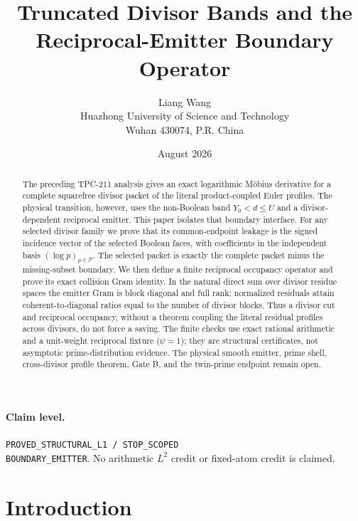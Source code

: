 \documentclass[11pt]{article}
\title{\textbf{Truncated Divisor Bands and the Reciprocal-Emitter Boundary Operator}}
\author{Liang Wang\\
Huazhong University of Science and Technology\\
Wuhan 430074, P.R. China}
\date{August 2026}
\theoremstyle{definition}
\theoremstyle{remark}
\newcommand{\PP}{\mathcal P}
\begin{document}
\maketitle

\begin{abstract}
The preceding TPC-211 analysis gives an exact logarithmic M\"obius derivative for a
complete squarefree divisor packet of the literal product-coupled Euler profiles.
The physical transition, however, uses the non-Boolean band $Y_0<d\leq U$ and a
divisor-dependent reciprocal emitter.  This paper isolates that boundary interface.
For any selected divisor family we prove that its common-endpoint leakage is the
signed incidence vector of the selected Boolean faces, with coefficients in the
independent basis $(\log p)_{p\in\PP}$.  The selected packet is exactly the complete
packet minus the missing-subset boundary.  We then define a finite reciprocal
occupancy operator and prove its exact collision Gram identity.  In the natural
direct sum over divisor residue spaces the emitter Gram is block diagonal and full
rank; normalized residuals attain coherent-to-diagonal ratios equal to the number
of divisor blocks.  Thus a divisor cut and reciprocal occupancy, without a theorem
coupling the literal residual profiles across divisors, do not force a saving.  The
finite checks use exact rational arithmetic and a unit-weight reciprocal fixture
($\psi=1$); they are structural certificates, not asymptotic prime-distribution
evidence.  The physical smooth emitter, prime shell, cross-divisor profile theorem,
Gate B, and the twin-prime endpoint remain open.
\end{abstract}

\paragraph{Claim level.}
\texttt{PROVED\_STRUCTURAL\_L1 / STOP\_SCOPED}\\
\texttt{BOUNDARY\_EMITTER}.
No arithmetic $L^2$ credit or fixed-atom credit is claimed.

\section{Introduction}
\end{document}
